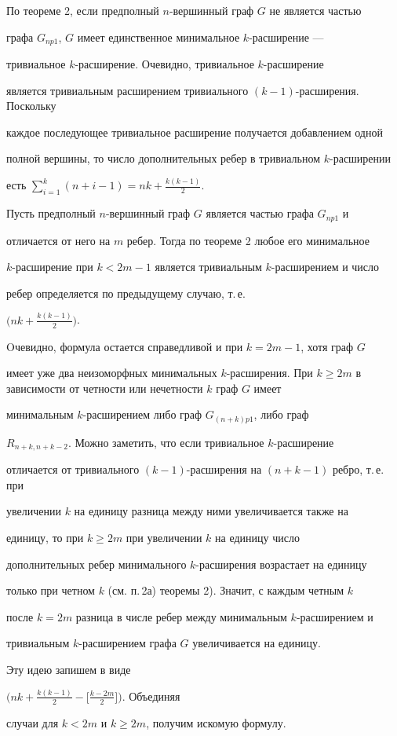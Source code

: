 \begin{pf}


По теореме 2, если предполный $n$-вершинный граф $G$ не является частью


графа $G_{np1}$, $G$ имеет единственное минимальное $k$-расширение ---


тривиальное $k$-расширение. Очевидно, тривиальное $k$-расширение


является тривиальным расширением тривиального $(k-1)$-расширения. Поскольку


каждое последующее тривиальное расширение получается добавлением одной


полной вершины, то число дополнительных ребер в тривиальном $k$-расширении


есть $ \sum \limits_{i=1}^{k}(n + i - 1) = nk + \frac{k(k-1)}{2} $.





Пусть предполный $n$-вершинный граф $G$ является частью графа $G_{np1}$ и


отличается от него на $m$ ребер. Тогда по теореме 2 любое его минимальное


$k$-расширение при $k < 2m-1$ является тривиальным $k$-расширением и число


ребер определяется по предыдущему случаю, т.\,е.


$\big(nk + \frac{k(k-1)}{2}\big)$.


Oчевидно, формула остается справедливой и при $k = 2m - 1$, хотя граф $G$


имеет уже два неизоморфных минимальных $k$-расширения. При $k \geq


2m$ в зависимости от четности или нечетности $k$ граф $G$ имеет


минимальным $k$-расширением либо граф $G_{(n+k)p1}$, либо граф


$R_{n+k,n+k-2}$. Можно заметить, что если тривиальное $k$-расширение


отличается от тривиального $(k-1)$-расширения на $(n+k-1)$ ребро, т.\,е. при


увеличении $k$ на единицу разница между ними увеличивается также на


единицу, то при $k \geq 2m$ при увеличении $k$ на единицу число


дополнительных ребер минимального $k$-расширения возрастает на единицу


только при четном $k$ (см. п.\,2а) теоремы 2). Значит, с каждым четным $k$


после $k = 2m$ разница в числе ребер между минимальным $k$-расширением и


тривиальным $k$-расширением графа $G$ увеличивается на единицу. 


Эту идею запишем в виде


$\big(nk + \frac{k(k-1)}{2} - \big[ \frac{k - 2m}{2} \big]\big)$. Объединяя


случаи для $k < 2m$ и $k \geq 2m$, получим искомую формулу.


\end{pf}





